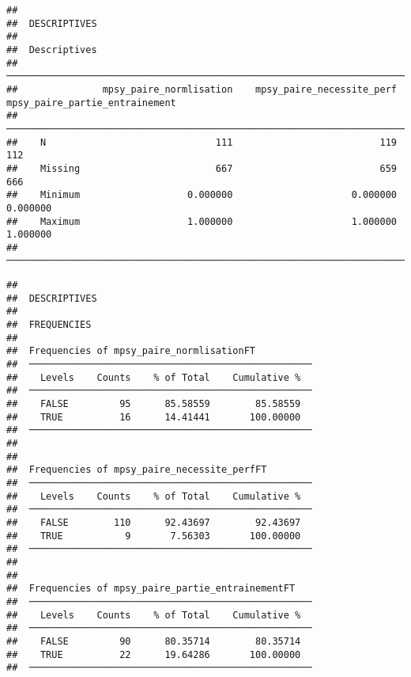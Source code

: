 \documentclass[
]{article}
\begin{document}
\begin{verbatim}
## 
##  DESCRIPTIVES
## 
##  Descriptives                                                                                          
##  ───────────────────────────────────────────────────────────────────────────────────────────────────── 
##               mpsy_paire_normlisation    mpsy_paire_necessite_perf    mpsy_paire_partie_entrainement   
##  ───────────────────────────────────────────────────────────────────────────────────────────────────── 
##    N                              111                          119                               112   
##    Missing                        667                          659                               666   
##    Minimum                   0.000000                     0.000000                          0.000000   
##    Maximum                   1.000000                     1.000000                          1.000000   
##  ─────────────────────────────────────────────────────────────────────────────────────────────────────
\end{verbatim}

\begin{verbatim}
## 
##  DESCRIPTIVES
## 
##  FREQUENCIES
## 
##  Frequencies of mpsy_paire_normlisationFT           
##  ────────────────────────────────────────────────── 
##    Levels    Counts    % of Total    Cumulative %   
##  ────────────────────────────────────────────────── 
##    FALSE         95      85.58559        85.58559   
##    TRUE          16      14.41441       100.00000   
##  ────────────────────────────────────────────────── 
## 
## 
##  Frequencies of mpsy_paire_necessite_perfFT         
##  ────────────────────────────────────────────────── 
##    Levels    Counts    % of Total    Cumulative %   
##  ────────────────────────────────────────────────── 
##    FALSE        110      92.43697        92.43697   
##    TRUE           9       7.56303       100.00000   
##  ────────────────────────────────────────────────── 
## 
## 
##  Frequencies of mpsy_paire_partie_entrainementFT    
##  ────────────────────────────────────────────────── 
##    Levels    Counts    % of Total    Cumulative %   
##  ────────────────────────────────────────────────── 
##    FALSE         90      80.35714        80.35714   
##    TRUE          22      19.64286       100.00000   
##  ──────────────────────────────────────────────────
\end{verbatim}
\end{document}
